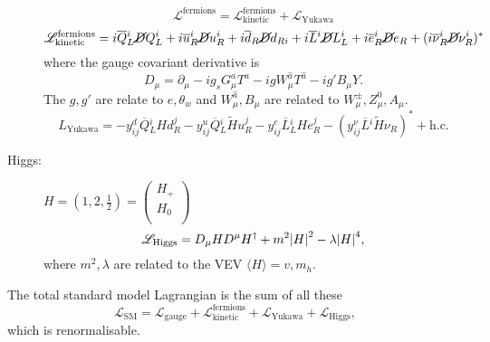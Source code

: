 \begin{description}
    \begin{equation}
      \mathscr{L}^{\text{fermions}} = \mathscr{L}^{\text{fermions}}_{\text{kinetic}} + \mathscr{L}_{\text{Yukawa}}
    \end{equation}  
    \begin{equation}
      \mathscr{L}_{\text{kinetic}}^{\text{fermions}} = i \overline{Q}{}_L^{i} \cancel{D} Q_L^{i} + i \overline{u}{}_R^{i} \cancel{D} u_R^{i} + i \overline{d}{}_R \cancel{D} d_{R i} + i \overline{L}{}^{i} \cancel{D} L_L^{i} + i \overline{e}{}_R^{i} \cancel{D} e_R + (i \overline{\nu}{}_R^{i} \cancel{D}\nu_R^{i})^*
    \end{equation}
    where the gauge covariant derivative is
    \begin{equation}
      D_{\mu} = \partial_{\mu} - i g_s G_{\mu}^{a} T^{a} - i g W_{\mu}^{\hat{a}} T^{\hat{a}} - i g' B_{\mu} Y.
    \end{equation}
    The $g, g'$ are relate to $e, \theta_w$ and $W_{\mu}^{\hat{a}}, B_{\mu}$ are related to $W_{\mu}^{\pm}, Z^0_{\mu}, A_{\mu}$.
    \begin{equation}
      L_{\text{Yukawa}} = - y^{d}_{ij} \overline{Q}{}^{i}_{L} H d_R^{j} - y^{u}_{ij} \overline{Q}{}^{i}_{L} \widetilde{H} u^{j}_{R} - y^{e}_{ij} \overline{L}{}^{i}_{L} H e^{j}_{R} - (y^{\nu}_{ij} \overline{L}{}^{i} \widetilde{H} \nu_{R})^* + \text{h.c.}
    \end{equation}
  \item[Higgs:] $H = (1, 2, \frac{1}{2}) = 
    \begin{pmatrix}
    H_+ \\
    H_0 \\
    \end{pmatrix} $
    \begin{equation}
      \mathscr{L}_{\text{Higgs}} = D_{\mu} H D^{\mu} H^{\dagger} + m^2 \abs{H}^2 - \lambda \abs{H}^4,
    \end{equation}
    where $m^2, \lambda$ are related to the VEV $\langle H \rangle = v, m_h$.
\end{description}
The total standard model Lagrangian is the sum of all these
\begin{equation}
  \mathscr{L}_{\text{SM}} = \mathscr{L}_{\text{gauge}} + \mathscr{L}_{\text{kinetic}}^{\text{fermions}} + \mathscr{L}_{\text{Yukawa}} + \mathscr{L}_{\text{Higgs}},
\end{equation}
which is renormalisable.
